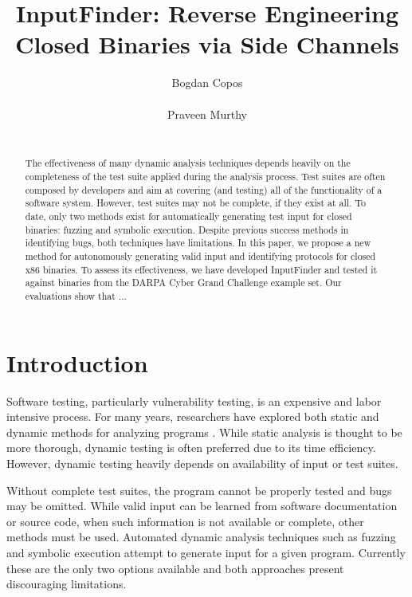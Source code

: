 \documentclass{acm_proc_article-sp}
\def \tool {InputFinder}
\begin{document}
\title{InputFinder: Reverse Engineering Closed Binaries via Side Channels}
\author{
\alignauthor
Bogdan Copos\\
	\\
\alignauthor
Praveen Murthy\\
	\\
}
\maketitle

\begin{abstract}
The effectiveness of many dynamic analysis techniques depends heavily on the completeness of the test suite applied during the analysis process.
Test suites are often composed by developers and aim at covering (and testing) all of the functionality of a software system.
However, test suites may not be complete, if they exist at all.
To date, only two methods exist for automatically generating test input for closed binaries: fuzzing and symbolic execution.
Despite previous success methods in identifying bugs, both techniques have limitations.
In this paper, we propose a new method for autonomously generating valid input and identifying protocols for closed x86 binaries.
To assess its effectiveness, we have developed \tool{} and tested it against binaries from the DARPA Cyber Grand Challenge example set.
Our evaluations show that ...
\end{abstract}

\section{Introduction}
Software testing, particularly vulnerability testing, is an expensive and labor intensive process.
For many years, researchers have explored both static and dynamic methods for analyzing programs \cite{smartfuzzer}.
While static analysis is thought to be more thorough, dynamic testing is often preferred due to its time efficiency.
However, dynamic testing heavily depends on availability of input or test suites.

Without complete test suites, the program cannot be properly tested and bugs may be omitted.
While valid input can be learned from software documentation or source code, when such information is not available or complete, other methods must be used.
Automated dynamic analysis techniques such as fuzzing and symbolic execution attempt to generate input for a given program.
Currently these are the only two options available and both approaches present discouraging limitations.
\end{document}
